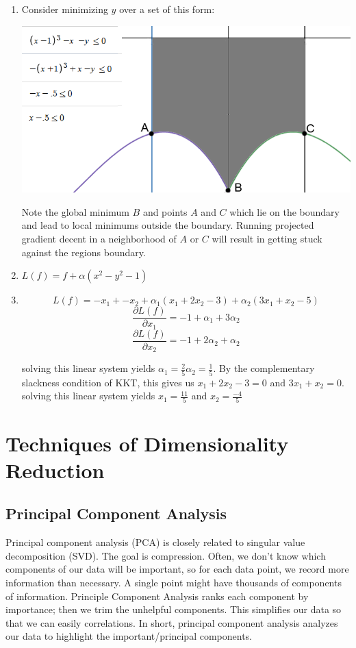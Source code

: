 \begin{enumerate}
    \item Consider minimizing $y$ over a set of this form:
    \begin{center}
        \includegraphics[scale=0.5]{images/Chapter4/constrained optimization example.png}
    \end{center}
    Note the global minimum $B$ and points $A$ and $C$ which lie on the boundary and lead to local minimums outside the boundary. Running projected gradient decent in a neighborhood of $A$ or $C$ will result in getting stuck against the regions boundary.
    \item $L(f) = f + \alpha(x^2 - y^2 - 1)$
    \item $$    L(f) = -x_1 + -x_2 + \alpha_1(x_1 + 2x_2 - 3) + \alpha_2(3x_1 +x_2 - 5) $$
    $$    \frac{\partial L(f)}{\partial x_1} = -1 + \alpha_1 + 3\alpha_2 $$
    $$    \frac{\partial L(f)}{\partial x_2} = -1 + 2\alpha_2 + \alpha_2 $$
    
    solving this linear system yields $\alpha_1 =\frac{2}{5} \alpha_2 = \frac{1}{5}$.
    By the complementary slackness condition of KKT, this gives us
    $x_1 +2x_2 - 3 = 0 $ and $3x_1 + x_2 = 0$.
    solving this linear system yields 
    $x_1 = \frac{11}{5}$ and $x_2 = \frac{-4}{5}$
\end{enumerate}

\chapter{Techniques of Dimensionality Reduction} \label{dim-reduction}

\section{Principal Component Analysis}

Principal component analysis (PCA) is closely related to singular value decomposition (SVD).  The goal is compression.  Often, we don't know which components of our data will be important, so for each data point, we record more information than necessary.  A single point might have thousands of components of information.  Principle Component Analysis ranks each component by importance; then we trim the unhelpful components.  This simplifies our data so that we can easily correlations.  In short, principal component analysis analyzes our data to highlight the important/principal components.

